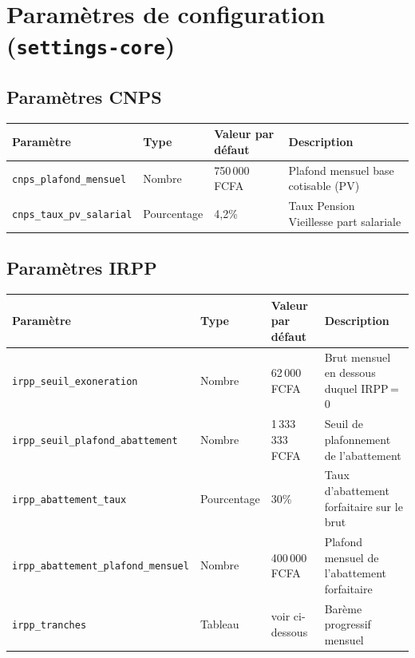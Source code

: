 \documentclass[a4paper,12pt,openany]{book}
\begin{document}
    \section{Paramètres de configuration (\texttt{settings-core})}

    \subsection{Paramètres CNPS}

    \begin{center}
        \begin{tabular}{llll}
            \hline
            \textbf{Paramètre} & \textbf{Type} & \textbf{Valeur par défaut} & \textbf{Description} \\
            \hline
            \texttt{cnps\_plafond\_mensuel}    & Nombre      & 750\,000 FCFA & Plafond mensuel base cotisable (PV) \\
            \texttt{cnps\_taux\_pv\_salarial}  & Pourcentage & 4,2\%         & Taux Pension Vieillesse part salariale \\
            \hline
        \end{tabular}
    \end{center}


    \subsection{Paramètres IRPP}

    \begin{center}
        \begin{tabular}{llll}
            \hline
            \textbf{Paramètre} & \textbf{Type} & \textbf{Valeur par défaut} & \textbf{Description} \\
            \hline
            \texttt{irpp\_seuil\_exoneration}         & Nombre      & 62\,000 FCFA    & Brut mensuel en dessous duquel IRPP\,=\,0 \\
            \texttt{irpp\_seuil\_plafond\_abattement} & Nombre      & 1\,333\,333 FCFA & Seuil de plafonnement de l'abattement \\
            \texttt{irpp\_abattement\_taux}           & Pourcentage & 30\%            & Taux d'abattement forfaitaire sur le brut \\
            \texttt{irpp\_abattement\_plafond\_mensuel} & Nombre    & 400\,000 FCFA   & Plafond mensuel de l'abattement forfaitaire \\
            \texttt{irpp\_tranches}                   & Tableau     & voir ci-dessous & Barème progressif mensuel \\
            \hline
        \end{tabular}
    \end{center}
\end{document}
